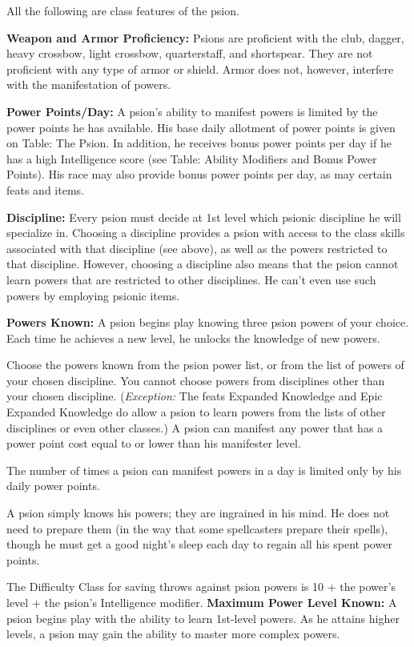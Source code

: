\documentclass{article}
\begin{document}
All the following are class features of the psion.

\textbf{Weapon and Armor Proficiency: }Psions are proficient with the club, dagger, 
heavy crossbow, light crossbow, quarterstaff, and shortspear. They are not proficient 
with any type of armor or shield. Armor does not, however, interfere with the manifestation 
of powers.

\textbf{Power Points/Day: }A psion's ability to manifest powers is limited by the 
power points he has available. His base daily allotment of power points is given 
on Table: The Psion. In addition, he receives bonus power points per day if he 
has a high Intelligence score (see Table: Ability Modifiers and Bonus Power Points). 
His race may also provide bonus power points per day, as may certain feats and 
items.

\textbf{Discipline: }Every psion must decide at 1st level which psionic discipline 
he will specialize in. Choosing a discipline provides a psion with access to the 
class skills associated with that discipline (see above), as well as the powers 
restricted to that discipline. However, choosing a discipline also means that the 
psion cannot learn powers that are restricted to other disciplines. He can't even 
use such powers by employing psionic items.

\textbf{Powers Known:} A psion begins play knowing three psion powers of your choice. 
Each time he achieves a new level, he unlocks the knowledge of new powers.

Choose the powers known from the psion power list, or from the list of powers of 
your chosen discipline. You cannot choose powers from disciplines other than your 
chosen discipline. (\textit{Exception: }The feats Expanded Knowledge and Epic Expanded 
Knowledge do allow a psion to learn powers from the lists of other disciplines 
or even other classes.) A psion can manifest any power that has a power point cost 
equal to or lower than his manifester level.

The number of times a psion can manifest powers in a day is limited only by his 
daily power points. 

A psion simply knows his powers; they are ingrained in his mind. He does not need 
to prepare them (in the way that some spellcasters prepare their spells), though 
he must get a good night's sleep each day to regain all his spent power points.

The Difficulty Class for saving throws against psion powers is 10 + the power's 
level + the psion's Intelligence modifier. \textbf{Maximum Power Level Known:} 
A psion begins play with the ability to learn 1st-level powers. As he attains higher 
levels, a psion may gain the ability to master more complex powers.
\end{document}
